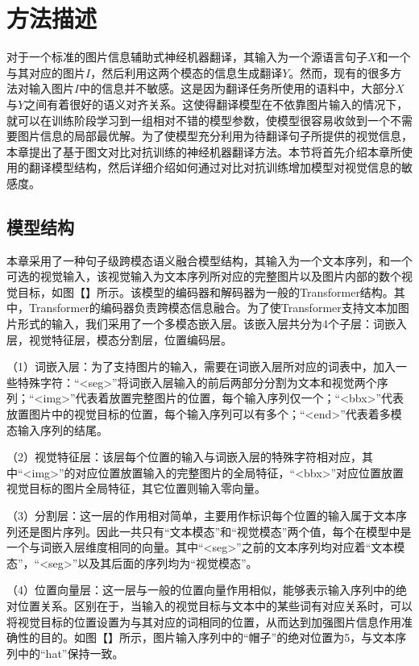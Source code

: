 \section{方法描述}
\label{sec:5_method}

对于一个标准的图片信息辅助式神经机器翻译，其输入为一个源语言句子$X$和一个与其对应的图片$I$，然后利用这两个模态的信息生成翻译$Y$。然而，现有的很多方法对输入图片$I$中的信息并不敏感。这是因为翻译任务所使用的语料中，大部分$X$与$Y$之间有着很好的语义对齐关系。这使得翻译模型在不依靠图片输入的情况下，就可以在训练阶段学习到一组相对不错的模型参数，使模型很容易收敛到一个不需要图片信息的局部最优解。为了使模型充分利用为待翻译句子所提供的视觉信息，本章提出了基于图文对比对抗训练的神经机器翻译方法。本节将首先介绍本章所使用的翻译模型结构，然后详细介绍如何通过对比对抗训练增加模型对视觉信息的敏感度。

\subsection{模型结构}
\label{sec:5_architecture}
本章采用了一种句子级跨模态语义融合模型结构，其输入为一个文本序列，和一个可选的视觉输入，该视觉输入为文本序列所对应的完整图片以及图片内部的数个视觉目标，如图【】所示。该模型的编码器和解码器为一般的Transformer结构。其中，Transformer的编码器负责跨模态信息融合。为了使Transformer支持文本加图片形式的输入，我们采用了一个多模态嵌入层。该嵌入层共分为4个子层：词嵌入层，视觉特征层，模态分割层，位置编码层。

（1）{\sffamily 词嵌入层：}为了支持图片的输入，需要在词嵌入层所对应的词表中，加入一些特殊字符：“<seg>”将词嵌入层输入的前后两部分分割为文本和视觉两个序列；“<img>”代表着放置完整图片的位置，每个输入序列仅一个；“<bbx>”代表放置图片中的视觉目标的位置，每个输入序列可以有多个；“<end>”代表着多模态输入序列的结尾。


（2）{\sffamily 视觉特征层：}该层每个位置的输入与词嵌入层的特殊字符相对应，其中“<img>”的对应位置放置输入的完整图片的全局特征，“<bbx>”对应位置放置视觉目标的图片全局特征，其它位置则输入零向量。


（3）{\sffamily 分割层：}这一层的作用相对简单，主要用作标识每个位置的输入属于文本序列还是图片序列。因此一共只有“文本模态”和“视觉模态”两个值，每个在模型中是一个与词嵌入层维度相同的向量。其中“<seg>”之前的文本序列均对应着“文本模态”，“<seg>”以及其后面的序列均为“视觉模态”。


（4）{\sffamily 位置向量层：}这一层与一般的位置向量作用相似，能够表示输入序列中的绝对位置关系。区别在于，当输入的视觉目标与文本中的某些词有对应关系时，可以将视觉目标的位置设置为与其对应的词相同的位置，从而达到加强图片信息作用准确性的目的。如图【】所示，图片输入序列中的“帽子”的绝对位置为5，与文本序列中的“hat”保持一致。


